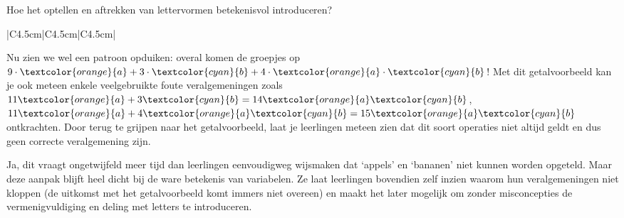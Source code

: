\begin{lesactiviteit}{Hoe het optellen en aftrekken van lettervormen betekenisvol introduceren?}
\begin{tabel}
\begin{tabular}{|C{4.5cm}|C{4.5cm}|C{4.5cm}|}
\end{tabular}
\end{tabel}
Nu zien we wel een patroon opduiken: overal komen de groepjes op $9\cdot \textcolor{orange}{a}+3\cdot \textcolor{cyan}{b} +4\cdot\textcolor{orange}{a}\cdot \textcolor{cyan}{b}$! Met dit getalvoorbeeld kan je ook meteen enkele veelgebruikte foute veralgemeningen zoals $11\textcolor{orange}{a}+3\textcolor{cyan}{b}=14\textcolor{orange}{a}\textcolor{cyan}{b}$, $11\textcolor{orange}{a}+4\textcolor{orange}{a}\textcolor{cyan}{b}=15\textcolor{orange}{a}\textcolor{cyan}{b}$ ontkrachten. Door terug te grijpen naar het getalvoorbeeld, laat je leerlingen meteen zien dat dit soort operaties niet altijd geldt en dus geen correcte veralgemening zijn. 

Ja, dit vraagt ongetwijfeld meer tijd dan leerlingen eenvoudigweg wijsmaken dat ‘appels’ en ‘bananen’ niet kunnen worden opgeteld. Maar deze aanpak blijft heel dicht bij de ware betekenis van variabelen. Ze laat leerlingen bovendien zelf inzien waarom hun veralgemeningen niet kloppen (de uitkomst met het getalvoorbeeld komt immers niet overeen) en maakt het later mogelijk om zonder misconcepties de vermenigvuldiging en deling met letters te introduceren.\end{lesactiviteit}
\stopcontents[inhoudloep]		%

\clearpage


